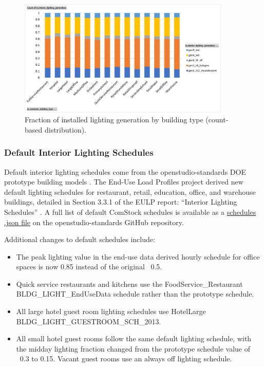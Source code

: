 \begin{figure}[ht!]
    \centering \includegraphics[width=0.9\textwidth]{figures/ltg_btype_dist.png}
    \caption[Fraction of installed lighting generation by building type]{Fraction of installed lighting generation by building type (count-based distribution).}
    \label{fig:ltg_btype_dist}
\end{figure}

\pagebreak

\subsubsection{Default Interior Lighting Schedules}
Default interior lighting schedules come from the openstudio-standards DOE prototype building models \citep{deru_2011}.  The End-Use Load Profiles project derived new default lighting schedules for restaurant, retail, education, office, and warehouse buildings, detailed in Section 3.3.1 of the EULP report: ``Interior Lighting Schedules'' \citep{eulp_method_2022}. A full list of default ComStock schedules is available as a  \href{https://github.com/NREL/openstudio-standards/blob/master/lib/openstudio-standards/standards/ashrae_90_1/ashrae_90_1_2013/comstock_ashrae_90_1_2013/data/ashrae_90_1.schedules.json}{schedules .json file} on the openstudio-standards GitHub repository.

Additional changes to default schedules include:

\begin{itemize}
  \item The peak lighting value in the end-use data derived hourly schedule for office spaces is now 0.85 instead of the original ~0.5.
  \item Quick service restaurants and kitchens use the FoodService\_Restaurant BLDG\_LIGHT\_EndUseData schedule rather than the prototype schedule.
  \item All large hotel guest room lighting schedules use HotelLarge BLDG\_LIGHT\_GUESTROOM\_SCH\_2013.
  \item All small hotel guest rooms follow the same default lighting schedule, with the midday lighting fraction changed from the prototype schedule value of ~0.3 to 0.15. Vacant guest rooms use an always off lighting schedule.
\end{itemize}

